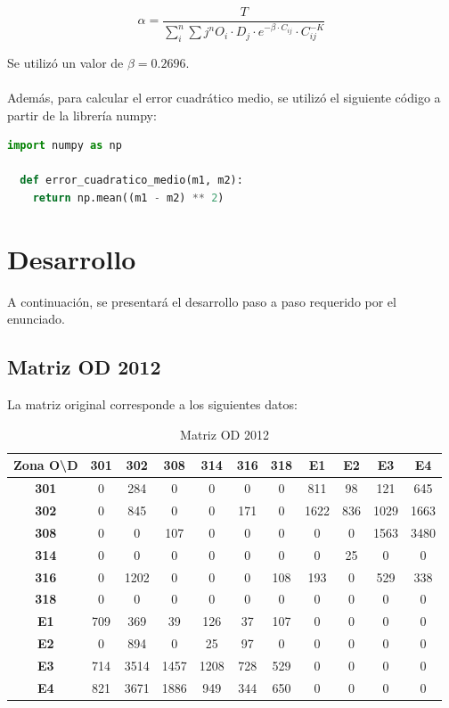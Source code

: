 \documentclass[12pt]{article} %
\begin{document}
\begin{equation}
  \alpha = \frac{T}{\sum_{i}^{n} \sum{j}^{n} O_i \cdot D_j \cdot e^{-\beta \cdot C_{ij}} \cdot C_{ij}^{-K}}
\end{equation}

Se utilizó un valor de \(\beta = 0.2696\).
\\ \\
Además, para calcular el error cuadrático medio, se utilizó el siguiente código a partir de la librería numpy:

\begin{lstlisting}[language=Python]
  import numpy as np

  def error_cuadratico_medio(m1, m2):
    return np.mean((m1 - m2) ** 2)
\end{lstlisting}

\newpage
\section{Desarrollo}

A continuación, se presentará el desarrollo paso a paso requerido por el enunciado.

\subsection{Matriz OD 2012}

La matriz original corresponde a los siguientes datos:

\begin{table}[H]
  \centering
  \footnotesize
  \begin{tabular}{c|cccccccccc}    
  \textbf{Zona O\textbackslash D} & \textbf{301} & \textbf{302} & \textbf{308} & \textbf{314} & \textbf{316} & \textbf{318} & \textbf{E1} & \textbf{E2} & \textbf{E3} & \textbf{E4} \\ \hline
  \textbf{301} & 0 & 284 & 0 & 0 & 0 & 0 & 811 & 98 & 121 & 645 \\ 
  \textbf{302} & 0 & 845 & 0 & 0 & 171 & 0 & 1622 & 836 & 1029 & 1663 \\ 
  \textbf{308} & 0 & 0 & 107 & 0 & 0 & 0 & 0 & 0 & 1563 & 3480 \\ 
  \textbf{314} & 0 & 0 & 0 & 0 & 0 & 0 & 0 & 25 & 0 & 0 \\ 
  \textbf{316} & 0 & 1202 & 0 & 0 & 0 & 108 & 193 & 0 & 529 & 338 \\ 
  \textbf{318} & 0 & 0 & 0 & 0 & 0 & 0 & 0 & 0 & 0 & 0 \\ 
  \textbf{E1} & 709 & 369 & 39 & 126 & 37 & 107 & 0 & 0 & 0 & 0 \\ 
  \textbf{E2} & 0 & 894 & 0 & 25 & 97 & 0 & 0 & 0 & 0 & 0 \\ 
  \textbf{E3} & 714 & 3514 & 1457 & 1208 & 728 & 529 & 0 & 0 & 0 & 0 \\ 
  \textbf{E4} & 821 & 3671 & 1886 & 949 & 344 & 650 & 0 & 0 & 0 & 0 \\ 
  \end{tabular}
  \caption{Matriz OD 2012}
  \label{table:M_2012}
\end{table}
\end{document}
